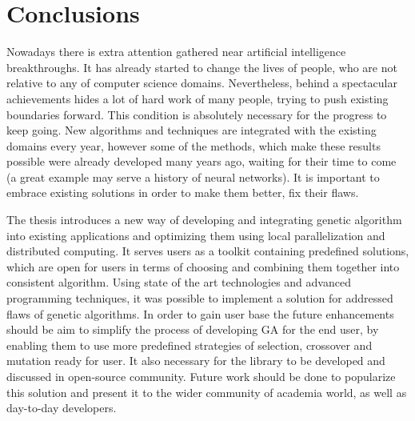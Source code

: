 \chapter*{Conclusions}

Nowadays there is extra attention gathered near artificial intelligence breakthroughs. It has already started to change the lives of people, who are not relative to any of computer science domains. Nevertheless, behind a spectacular achievements hides a lot of hard work of many people, trying to push existing boundaries forward. This condition is absolutely necessary for the progress to keep going. New algorithms and techniques are integrated with the existing domains every year, however some of the methods, which make these results possible were already developed many years ago, waiting for their time to come (a great example may serve a history of neural networks). It is important to embrace existing solutions in order to make them better, fix their flaws.

The thesis introduces a new way of developing and integrating genetic algorithm into existing applications and optimizing them using local parallelization and distributed computing. It serves users as a toolkit containing predefined solutions, which are open for users in terms of choosing and combining them together into consistent algorithm. Using state of the art technologies and advanced programming techniques, it was possible to implement a solution for addressed flaws of genetic algorithms. In order to gain user base the future enhancements should be aim to simplify the process of developing GA for the end user, by enabling them to use more predefined strategies of selection, crossover and mutation ready for user. It also necessary for the library to be developed and discussed in open-source community. Future work should be done to popularize this solution and present it to the wider community of academia world, as well as day-to-day developers.